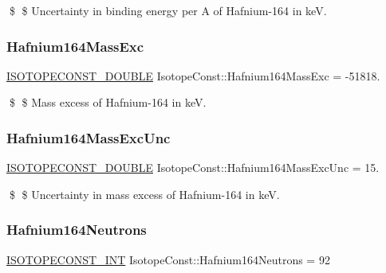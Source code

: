 \$ \$ Uncertainty in binding energy per A of Hafnium-\/164 in keV. \mbox{\label{group___isotope_const-_hafnium-_hf164_gaf365c6cf1f8f7d133bd24b5cfb7369ca}} 
\subsubsection{\texorpdfstring{Hafnium164\+Mass\+Exc}{Hafnium164MassExc}}
{\footnotesize\ttfamily \mbox{\hyperlink{group___isotope_const-_macros_ga8f45a7272ce02c0b4c65c44636ed719a}{I\+S\+O\+T\+O\+P\+E\+C\+O\+N\+S\+T\+\_\+\+D\+O\+U\+B\+LE}} Isotope\+Const\+::\+Hafnium164\+Mass\+Exc = -\/51818.}

\$ \$ Mass excess of Hafnium-\/164 in keV. \mbox{\label{group___isotope_const-_hafnium-_hf164_gad073ff1b6c0885118b7912b39af868d2}} 
\subsubsection{\texorpdfstring{Hafnium164\+Mass\+Exc\+Unc}{Hafnium164MassExcUnc}}
{\footnotesize\ttfamily \mbox{\hyperlink{group___isotope_const-_macros_ga8f45a7272ce02c0b4c65c44636ed719a}{I\+S\+O\+T\+O\+P\+E\+C\+O\+N\+S\+T\+\_\+\+D\+O\+U\+B\+LE}} Isotope\+Const\+::\+Hafnium164\+Mass\+Exc\+Unc = 15.}

\$ \$ Uncertainty in mass excess of Hafnium-\/164 in keV. \mbox{\label{group___isotope_const-_hafnium-_hf164_ga836d77345ed18dec1a6cc68bf2aa3a3f}} 
\subsubsection{\texorpdfstring{Hafnium164\+Neutrons}{Hafnium164Neutrons}}
{\footnotesize\ttfamily \mbox{\hyperlink{group___isotope_const-_macros_ga5f18360b3e99483a35c32d789e62621c}{I\+S\+O\+T\+O\+P\+E\+C\+O\+N\+S\+T\+\_\+\+I\+NT}} Isotope\+Const\+::\+Hafnium164\+Neutrons = 92}

